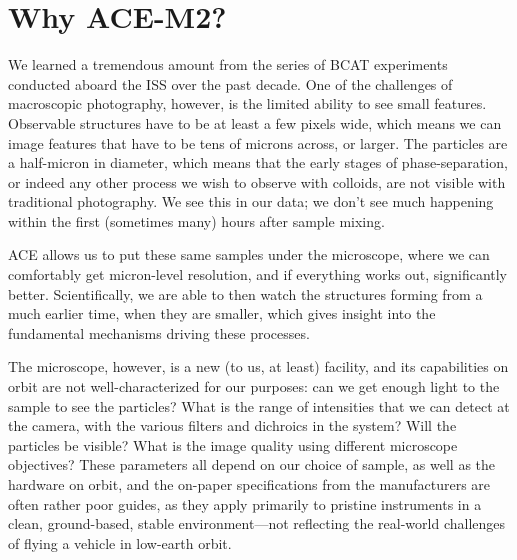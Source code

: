 \section{Why ACE-M2?}\label{why-ace-m2}
We learned a tremendous amount from the series of BCAT experiments conducted aboard the ISS over the past decade. One of the challenges of macroscopic photography, however, is the limited ability to see small features. Observable structures have to be at least a few pixels wide, which means we can image features that have to be tens of microns across, or larger. The particles are a half-micron in diameter, which means that the early stages of phase-separation, or indeed any other process we wish to observe with colloids, are not visible with traditional photography. We see this in our data; we don't see much happening within the first (sometimes many) hours after sample mixing.

ACE allows us to put these same samples under the microscope, where we can comfortably get micron-level resolution, and if everything works out, significantly better. Scientifically, we are able to then watch the structures forming from a much earlier time, when they are smaller, which gives insight into the fundamental mechanisms driving these processes. 

The microscope, however, is a new (to us, at least) facility, and its capabilities on orbit are not well-characterized for our purposes: can we get enough light to the sample to see the particles? What is the range of intensities that we can detect at the camera, with the various filters and dichroics in the system? Will the particles be visible? What is the image quality using different microscope objectives? These parameters all depend on our choice of sample, as well as the hardware on orbit, and the on-paper specifications from the manufacturers are often rather poor guides, as they apply primarily to pristine instruments in a clean, ground-based, stable environment---not reflecting the real-world challenges of flying a vehicle in low-earth orbit.

